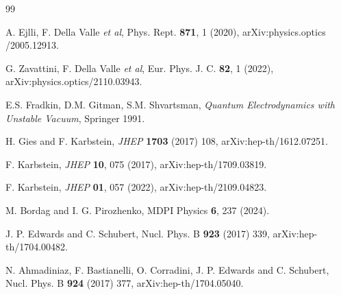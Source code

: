 \documentclass[a4paper,11pt]{article}
\begin{document}
\begin{thebibliography}{99}
 
 A. Ejlli, F. Della Valle \textit{et al}, 
Phys. Rept. {\bf 871}, 1 (2020), arXiv:physics.optics /2005.12913.

 G. Zavattini, F. Della Valle \textit{et al}, 
 Eur. Phys. J. C. {\bf 82}, 1 (2022), arXiv:physics.optics/2110.03943.
 
E.S. Fradkin, D.M. Gitman, S.M. Shvartsman, {\it Quantum Electrodynamics with Unstable Vacuum}, Springer 1991.

H. Gies and F. Karbstein,
{\it JHEP} {\bf 1703} (2017) 108,  arXiv:hep-th/1612.07251.  

F. Karbstein, 
{\it JHEP} {\bf 10}, 075 (2017), arXiv:hep-th/1709.03819.


F. Karbstein, 
{\it JHEP} {\bf 01}, 057 (2022), arXiv:hep-th/2109.04823.

M. Bordag and I. G. Pirozhenko, 
MDPI Physics {\bf 6}, 237 (2024).

%
%
%
%

J. P. Edwards and C. Schubert,
Nucl. Phys. B {\bf 923} (2017) 339, 
arXiv:hep-th/1704.00482.

N. Ahmadiniaz, F. Bastianelli, O. Corradini, J. P. Edwards and C. Schubert,
Nucl. Phys. B {\bf 924} (2017) 377,
arXiv:hep-th/1704.05040.


\end{thebibliography}
\end{document}
